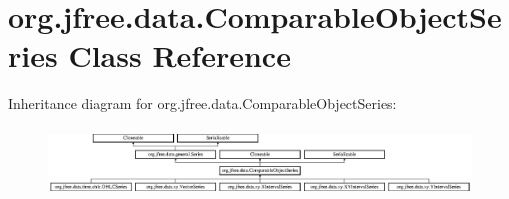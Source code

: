 \hypertarget{classorg_1_1jfree_1_1data_1_1_comparable_object_series}{}\section{org.\+jfree.\+data.\+Comparable\+Object\+Series Class Reference}
\label{classorg_1_1jfree_1_1data_1_1_comparable_object_series}
Inheritance diagram for org.\+jfree.\+data.\+Comparable\+Object\+Series\+:\begin{figure}[H]
\begin{center}
\leavevmode
\includegraphics[height=1.851240cm]{classorg_1_1jfree_1_1data_1_1_comparable_object_series}
\end{center}
\end{figure}
